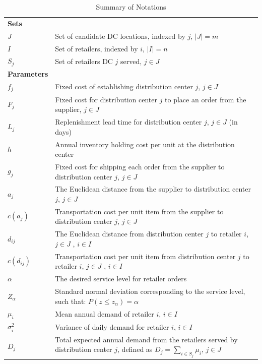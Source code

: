 \documentclass[]{article}
\theoremstyle{plain}%
\theoremstyle{definition}
\theoremstyle{remark}
\theoremstyle{plain}%
\begin{document}
    \renewcommand{\arraystretch}{1.25} %
    \begin{longtable}{p{3.5cm}p{12cm}}
    \caption{Summary of Notations} 
    \label{tab:notations}
    \\
    \toprule
    \textbf{Sets} &  \\
    $J$ & Set of candidate DC locations, indexed by $j$, $|J|=m$ \\
    $I$ & Set of retailers, indexed by $i$, $|I|=n$ \\
    $S_j$ & Set of retailers DC $j$ served, $j\in J $ \\
    \midrule
    \textbf{Parameters} & \\
    $f_j$ & Fixed cost of establishing distribution center $j$, $j\in J$\\
    $F_j$ & Fixed cost for distribution center $j$ to place an order from the supplier, $j\in J$\\
    $L_j$ & Replenishment lead time for distribution center $j$, $j\in J$ (in days)\\
    $h$ & Annual inventory holding cost per unit at the distribution center \\
    $g_j$ & Fixed cost for shipping each order from the supplier to distribution center $j$, $j\in J$ \\
    $a_j$ & The Euclidean distance from the supplier to distribution center $j$, $j\in J$ \\
    $c(a_j)$ & Transportation cost per unit item from the supplier to distribution center $j$, $j\in J$ \\
    $d_{ij}$ & The Euclidean distance from distribution center $j$ to retailer $i$, $j\in J$ , $i\in I$\\
    $c(d_{ij})$ & Transportation cost per unit item from distribution center $j$ to retailer $i$, $j\in J$ , $i\in I$\\
    $\alpha$ & The desired service level for retailer orders \\
    $Z_{\alpha}$ & Standard normal deviation corresponding to the service level, such that: $P(z\leq z_{\alpha})= \alpha$ \\
    $\mu_i$ & Mean annual demand of retailer $i$, $i\in I$ \\
    $\sigma^2_i$ & Variance of daily demand for retailer $i$, $i\in I$ \\
    $D_j$ & Total expected annual demand from the retailers served by distribution center $j$, defined as $D_j=\sum_{i\in S_j}\mu_i$, $ j\in J $\\

\end{longtable}
\end{document}

